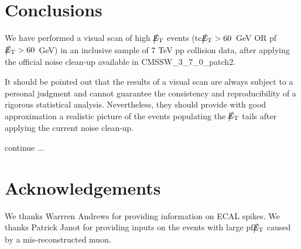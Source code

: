 \section{Conclusions}
We have performed a visual scan of high $\big\slash\hspace{-1.6ex}{E_\text{T}}$ events 
(tc$\big\slash\hspace{-1.6ex}{E_\text{T}}>60$~GeV OR pf$\big\slash\hspace{-1.6ex}{E_\text{T}}>60$~GeV)
in an inclusive sample of 7 TeV pp collision data, 
after applying the official noise clean-up available in CMSSW\_3\_7\_0\_patch2.

It should be pointed out that the results of a visual scan 
are always subject to a personal judgment and cannot guarantee 
the consistency and reproducibility of a rigorous statistical analysis. 
Nevertheless, they should provide with good approximation a realistic 
picture of the events populating the $\big\slash\hspace{-1.6ex}{E_\text{T}}$ tails after applying 
the current noise clean-up. 

continue ... 

\section{Acknowledgements}
We thanks Warrren Andrews for providing information on ECAL spikes.
We thanks Patrick Janot for providing inputs on the events with large pf$\big\slash\hspace{-1.6ex}{E_\text{T}}$ 
caused by a mis-reconstructed muon.

